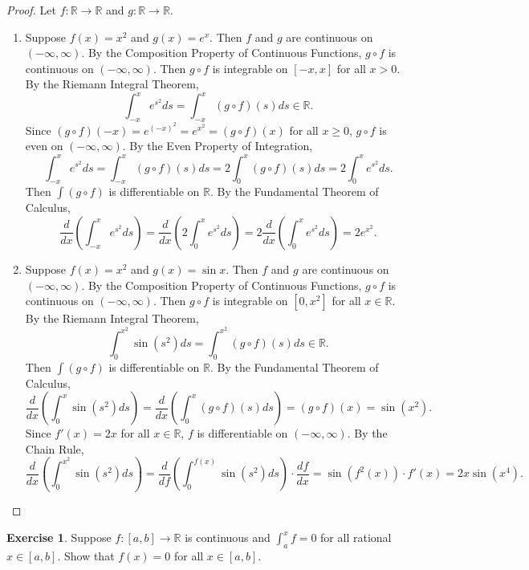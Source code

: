 \documentclass[12pt]{article}
\theoremstyle{definition}
\newtheorem{exercise}{Exercise}
\begin{document}
\begin{proof}
    Let \(f : \mathbb{R} \to \mathbb{R}\) and \(g : \mathbb{R} \to \mathbb{R}\).
    \begin{enumerate}[label=(\alph*)]
        \item Suppose \(f(x) = x^2\) and \(g(x) = e^x\). Then \(f\) and \(g\) are continuous on \((-\infty, \infty)\). By the Composition Property of Continuous Functions, \(g \circ f\) is continuous on \((-\infty, \infty)\). Then \(g \circ f\) is integrable on \([-x, x]\) for all \(x > 0\). By the Riemann Integral Theorem,
        \[
            \int_{-x}^{x} e^{s^2}ds = \int_{-x}^{x}(g \circ f)(s)ds \in \mathbb{R}.
        \]
        Since \((g \circ f)(-x) = e^{(-x)^2} = e^{x^2} = (g \circ f)(x)\) for all \(x \geq 0\), \(g \circ f\) is even on \((-\infty, \infty)\). By the Even Property of Integration,
        \[
            \int_{-x}^{x}e^{s^2}ds = \int_{-x}^{x}(g \circ f)(s)ds = 2 \int_{0}^{x}(g \circ f)(s)ds = 2\int_{0}^{x}e^{s^2}ds.
        \]
        Then \(\int (g \circ f)\) is differentiable on \(\mathbb{R}\). By the Fundamental Theorem of Calculus,
        \[
            \frac{d}{dx}\left(\int_{-x}^{x}e^{s^2}ds\right) = \frac{d}{dx} \left(2\int_{0}^{x} e^{s^2}ds\right) = 2\frac{d}{dx}\left(\int_{0}^{x}e^{s^2}ds\right) = 2e^{x^2}.
        \]
        \item Suppose \(f(x) = x^2\) and \(g(x) = \sin x\). Then \(f\) and \(g\) are continuous on \((-\infty, \infty)\). By the Composition Property of Continuous Functions, \(g \circ f\) is continuous on \((-\infty, \infty)\). Then \(g \circ f\) is integrable on \([0, x^2]\) for all \(x \in \mathbb{R}\). By the Riemann Integral Theorem,
        \[
            \int_{0}^{x^2}\sin(s^2)ds = \int_{0}^{x^2}(g \circ f)(s)ds \in \mathbb{R}.
        \]
        Then \(\int (g \circ f)\) is differentiable on \(\mathbb{R}\). By the Fundamental Theorem of Calculus, 
        \[
            \frac{d}{dx}\left(\int_{0}^{x}\sin(s^2)ds\right) = \frac{d}{dx}\left(\int_{0}^{x}(g \circ f)(s)ds\right) = (g \circ f)(x) = \sin(x^2).
        \]
        Since \(f'(x) = 2x\) for all \(x \in \mathbb{R}\), \(f\) is differentiable on \((-\infty, \infty)\). By the Chain Rule,
        \[
            \frac{d}{dx}\left(\int_{0}^{x^2}\sin(s^2)ds\right) = \frac{d}{df}\left(\int_{0}^{f(x)}\sin(s^2)ds\right) \cdot \frac{df}{dx} = \sin(f^2(x)) \cdot f'(x) = 2x\sin(x^4). 
        \]
    \end{enumerate}
\end{proof}

\begin{exercise}
    Suppose \(f : [a, b] \to \mathbb{R}\) is continuous and \(\int_{a}^{x} f = 0\) for all rational \(x \in [a, b]\). Show that \(f(x) = 0\) for all \(x \in [a, b]\).
\end{exercise}
\end{document}

